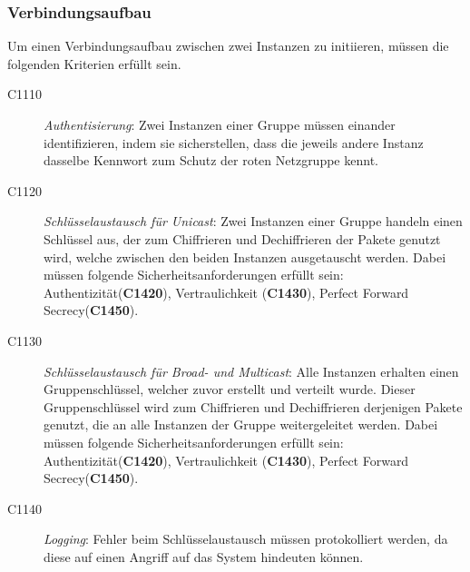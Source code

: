 \subsubsection{Verbindungsaufbau}
Um einen Verbindungsaufbau zwischen zwei Instanzen zu initiieren, müssen die folgenden Kriterien erfüllt sein.
	\begin{description}
	  \item[C1110] \textit{Authentisierung}: Zwei Instanzen einer Gruppe müssen einander identifizieren, indem sie sicherstellen, dass die jeweils andere Instanz dasselbe Kennwort zum Schutz der roten Netzgruppe kennt.

	  \item[C1120] \textit{Schlüsselaustausch für Unicast}: Zwei Instanzen einer Gruppe handeln einen Schlüssel aus, der zum Chiffrieren und Dechiffrieren der Pakete genutzt wird, welche zwischen den beiden Instanzen ausgetauscht werden. 
	  Dabei müssen folgende Sicherheitsanforderungen erfüllt sein: Authentizität(\textbf{C1420}), Vertraulichkeit (\textbf{C1430}), Perfect Forward Secrecy(\textbf{C1450}).
	  
	  \item[C1130] \textit{Schlüsselaustausch für Broad- und Multicast}: Alle Instanzen erhalten einen Gruppenschlüssel, welcher zuvor erstellt und verteilt wurde. 
	  Dieser Gruppenschlüssel wird zum Chiffrieren und Dechiffrieren derjenigen Pakete genutzt, die an alle Instanzen der Gruppe weitergeleitet werden.
	  Dabei müssen folgende Sicherheitsanforderungen erfüllt sein: Authentizität(\textbf{C1420}), Vertraulichkeit (\textbf{C1430}), Perfect Forward Secrecy(\textbf{C1450}).
	  	  
	 \item[C1140] \textit{{\color{glossb}Logging}}: Fehler beim Schlüsselaustausch müssen protokolliert werden, da diese auf einen Angriff auf das System hindeuten können.
	  
	\end{description}



